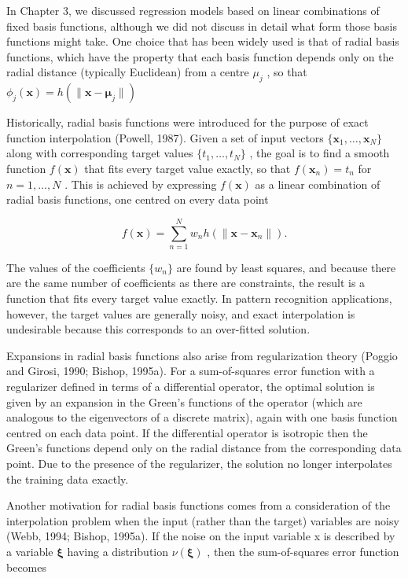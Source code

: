 \documentclass[
  10
]{article}
\begin{document}
In Chapter 3, we discussed regression models based on linear
combinations of fixed basis functions, although we did not discuss in
detail what form those basis functions might take. One choice that has
been widely used is that of radial basis functions, which have the
property that each basis function depends only on the radial distance
(typically Euclidean) from a centre \(\mu _ { j }\) , so that
\(\phi _ { j } ( \mathbf { x } ) = h ( \| \mathbf { x } - \pmb { \mu } _ { j } \| )\)

Historically, radial basis functions were introduced for the purpose of
exact function interpolation (Powell, 1987). Given a set of input
vectors \(\{ \mathbf { x } _ { 1 } , \hdots , \mathbf { x } _ { N } \}\)
along with corresponding target values
\(\{ t _ { 1 } , \ldots , t _ { N } \}\) , the goal is to find a smooth
function \(f ( \mathbf { x } )\) that fits every target value exactly,
so that \(f ( \mathbf { x } _ { n } ) = t _ { n }\) for
\(n = 1 , \ldots , N\) . This is achieved by expressing
\(f ( \mathbf { x } )\) as a linear combination of radial basis
functions, one centred on every data point

\[
f (\mathbf {x}) = \sum_ {n = 1} ^ {N} w _ {n} h (\| \mathbf {x} - \mathbf {x} _ {n} \|).\tag{6.38}
\]

The values of the coefficients \(\{ w _ { n } \}\) are found by least
squares, and because there are the same number of coefficients as there
are constraints, the result is a function that fits every target value
exactly. In pattern recognition applications, however, the target values
are generally noisy, and exact interpolation is undesirable because this
corresponds to an over-fitted solution.

Expansions in radial basis functions also arise from regularization
theory (Poggio and Girosi, 1990; Bishop, 1995a). For a sum-of-squares
error function with a regularizer defined in terms of a differential
operator, the optimal solution is given by an expansion in the Green's
functions of the operator (which are analogous to the eigenvectors of a
discrete matrix), again with one basis function centred on each data
point. If the differential operator is isotropic then the Green's
functions depend only on the radial distance from the corresponding data
point. Due to the presence of the regularizer, the solution no longer
interpolates the training data exactly.

Another motivation for radial basis functions comes from a consideration
of the interpolation problem when the input (rather than the target)
variables are noisy (Webb, 1994; Bishop, 1995a). If the noise on the
input variable x is described by a variable \(\boldsymbol { \xi }\)
having a distribution \(\nu ( \pmb { \xi } )\) , then the sum-of-squares
error function becomes
\end{document}
